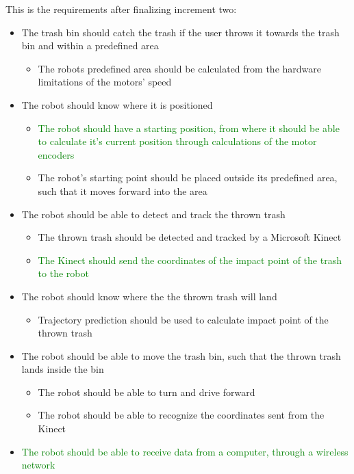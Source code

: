 This is the requirements after finalizing increment two: 
\begin{itemize}
	\item The trash bin should catch the trash if the user throws it towards the trash bin and within a predefined area
	\begin{itemize}
		\item {The robots predefined area should be calculated from the hardware limitations of the motors’ speed}
	\end{itemize}
	\item The robot should know where it is positioned
	\begin{itemize}
		\item \textcolor{green}{The robot should have a starting position, from where it should be able to calculate it's current position through calculations of the motor encoders}
		\item {The robot's starting point should be placed outside its predefined area, such that it moves forward into the area}
	\end{itemize}
	\item The robot should be able to detect and track the thrown trash
	\begin{itemize}
		\item {The thrown trash should be detected and tracked by a Microsoft Kinect}
		\item \textcolor{green}{The Kinect should send the coordinates of the impact point of the trash to the robot}
	\end{itemize}
	\item The robot should know where the the thrown trash will land
	\begin{itemize}
		\item {Trajectory prediction should be used to calculate impact point of the thrown trash}
	\end{itemize}
	\item The robot should be able to move the trash bin, such that the thrown trash lands inside the bin
	\begin{itemize}
		\item {The robot should be able to turn and drive forward}
		\item {The robot should be able to recognize the coordinates sent from the Kinect}
	\end{itemize}
	\item \textcolor{green}{The robot should be able to receive data from a computer, through a wireless network}
\end{itemize}

